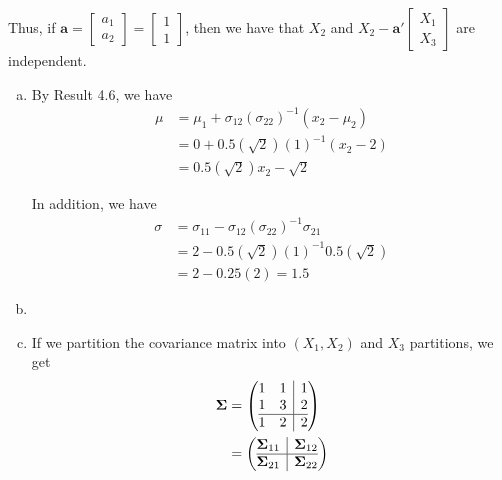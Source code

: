 \documentclass[12pt]{article}\usepackage[]{graphicx}\usepackage[]{color}
\newenvironment{problem}[2][Problem]{\begin{trivlist}
\item[\hskip \labelsep {\bfseries #1}\hskip \labelsep {\bfseries #2.}]}{\end{trivlist}}
\newcommand{\vct}{\mathbf}
\begin{document}
Thus, if $\vct{a} = \begin{bmatrix} a_1 \\ a_2 \end{bmatrix} = \begin{bmatrix} 1 \\ 1 \end{bmatrix}$, then we have that $X_2$ and $X_2 - \vct{a}'\begin{bmatrix} X_1 \\ X_3 \end{bmatrix}$ are independent.

\begin{problem}{4.5}
\end{problem}

\begin{enumerate}[a)]

\item By Result 4.6, we have 
\begin{align*}
\mu &= \mu_1 + \sigma_{12}(\sigma_{22})^{-1}(x_2 - \mu_2)\\
&= 0 + 0.5(\sqrt{2})(1)^{-1}(x_2 - 2)\\
&= 0.5(\sqrt{2})x_2 - \sqrt{2}
\end{align*}

In addition, we have 
\begin{align*}
\sigma &= \sigma_{11} - \sigma_{12}(\sigma_{22})^{-1}\sigma_{21}\\
&= 2 - 0.5(\sqrt{2})(1)^{-1}0.5(\sqrt{2})\\
&= 2 - 0.25(2) = 1.5
\end{align*}

\item


\item If we partition the covariance matrix into $(X_1, X_2)$ and $X_3$ partitions, we get
\begin{align*}
\vct{\Sigma} &= \left(\begin{array}{@{}cc|c@{}}
    1 & 1 & 1 \\
    1 & 3 & 2 \\\hline
    1 & 2 & 2
  \end{array}\right)\\
&=\left(\begin{array}{@{}c|c@{}}
    \vct{\Sigma}_{11} & \vct{\Sigma}_{12} \\\hline
    \vct{\Sigma}_{21} & \vct{\Sigma}_{22}
  \end{array}\right)
\end{align*}


\end{enumerate}
\end{document}
